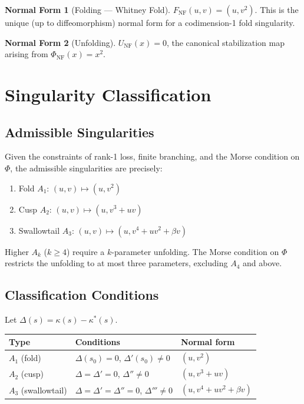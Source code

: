 \documentclass[12pt, oneside]{book}
\theoremstyle{plain}
\theoremstyle{definition}
\newtheorem{normalform}{Normal Form}[section]
\theoremstyle{remark}
\begin{document}
\begin{normalform}[Folding --- Whitney Fold]
$F_{\mathrm{NF}}(u,v) = (u, v^2)$. This is the unique (up to
diffeomorphism) normal form for a codimension-1 fold singularity.
\end{normalform}

\begin{normalform}[Unfolding]
$U_{\mathrm{NF}}(x) = 0$, the canonical stabilization map arising
from $\Phi_{\mathrm{NF}}(x) = x^2$.
\end{normalform}

\section{Singularity Classification}

\subsection{Admissible Singularities}

Given the constraints of rank-1 loss, finite branching, and the Morse
condition on $\Phi$, the admissible singularities are precisely:

\begin{enumerate}
\item Fold $A_1$: $(u,v) \mapsto (u, v^2)$
\item Cusp $A_2$: $(u,v) \mapsto (u, v^3 + uv)$
\item Swallowtail $A_3$: $(u,v) \mapsto (u, v^4 + uv^2 + \beta v)$
\end{enumerate}

Higher $A_k$ ($k \ge 4$) require a $k$-parameter unfolding. The Morse
condition on $\Phi$ restricts the unfolding to at most three
parameters, excluding $A_4$ and above.

\subsection{Classification Conditions}

Let $\Delta(s) = \kappa(s) - \kappa^*(s)$.

\begin{center}
\begin{tabular}{lll}
\toprule
Type & Conditions & Normal form \\
\midrule
$A_1$ (fold) & $\Delta(s_0)=0$, $\Delta'(s_0)\ne 0$ & $(u,v^2)$ \\
$A_2$ (cusp) & $\Delta=\Delta'=0$, $\Delta''\ne 0$ & $(u,v^3+uv)$ \\
$A_3$ (swallowtail) & $\Delta=\Delta'=\Delta''=0$, $\Delta'''\ne 0$
  & $(u,v^4+uv^2+\beta v)$ \\
\bottomrule
\end{tabular}
\end{center}
\end{document}
